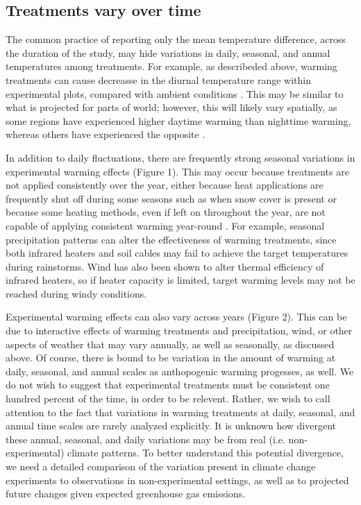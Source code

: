 \documentclass{article}
\begin{document}
\subsection* {Treatments vary over time}
The common practice of reporting only the mean temperature difference, across the duration of the study, may hide variations in daily, seasonal, and annual temperatures among treatments. For example, as describeded above, warming treatments can cause decreasse in the diurnal temperature range within experimental plots, compared with ambient conditions \citep{hoeppner2012}. This may be similar to what is projected for parts of world; however, this will likely vary spatially, as some regions have experienced higher daytime warming than nighttime warming, whereas others have experienced the opposite \citep{ipcc2013}. 
\par In addition to daily fluctuations, there are frequently strong seasonal variations in experimental warming effects (Figure 1). This may occur because treatments are not applied consistently over the year, either because heat applications are frequently shut off during some seasons such as when snow cover is present or because some heating methods, even if left on throughout the year, are not capable of applying consistent warming year-round \citep[e.g.][]{clark2014a,clark2014b,hagedorn2010}. For example, seasonal precipitation patterns can alter the effectiveness of warming treatments, since both infrared heaters and soil cables may fail to achieve the target temperatures during  rainstorms\citep{peterjohn1993,hoeppner2012}. Wind has also been shown to alter thermal efficiency of infrared heaters, so if heater capacity is limited, target warming levels may not be reached during windy conditions\citep{kimball2005,kimball2008}.

\par Experimental warming effects can also vary across years  (Figure  2). This  can be due  to interactive effects of warming  treatments and  precipitation, wind, or other aspects of weather  that may  vary  annually, as well as seasonally, as discussed above. Of course, there is bound to be variation in the amount of warming at daily, seasonal, and annual scales as anthopogenic warming progesses, as well. We do not wish to suggest that experimental treatments must be consistent one hundred percent of the time, in order to be relevent. Rather, we wish to call attention to the fact that variations in warming treatments at daily, seasonal, and annual time scales are rarely analyzed explicitly.  It is unknown how divergent these annual, seasonal, and daily variations may be from real (i.e. non-experimental) climate patterns. To better understand this potential divergence, we need a detailed comparison of the variation present in climate change experiments to observations in non-experimental settings, as well as to projected future changes given expected greenhouse gas emissions.  
\end{document}
